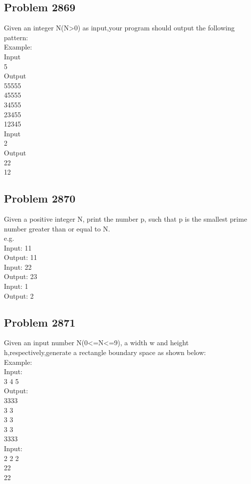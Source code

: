 \subsection{Problem 2869}

Given an integer N(N>0) as input,your program should output the following pattern:
\\Example:
\\Input
\\5
\\Output
\\55555
\\45555
\\34555
\\23455
\\12345
\\Input
\\2
\\Output
\\22
\\12

\subsection{Problem 2870}

Given a positive integer N, print the number p, such that p is the smallest prime number greater than or equal to N.
\\e.g.
\\Input: 11
\\Output: 11
\\Input: 22
\\Output: 23
\\Input: 1
\\Output: 2

\subsection{Problem 2871}

Given an input number N(0<=N<=9), a width w and height h,respectively,generate a rectangle boundary space as shown below:
\\Example:
\\Input:
\\3 4 5
\\Output:
\\3333
\\3  3
\\3  3
\\3  3
\\3333
\\Input:
\\2 2 2
\\22
\\22